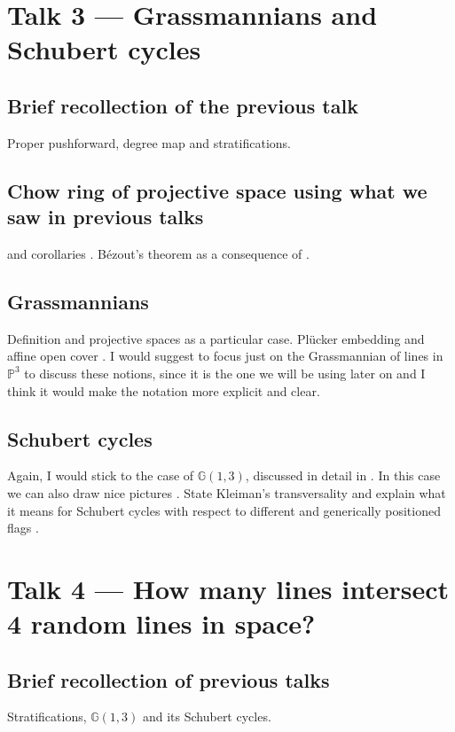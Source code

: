 \documentclass[A4paper, 12pt, british, reqno]{amsart}
\newcommand{\bbG}{\mathbb{G}}
\renewcommand{\P}{\mathbb{P}} %
\theoremstyle{plain}
\theoremstyle{definition}
\theoremstyle{remark}
\theoremstyle{plain}
\theoremstyle{definition}
\theoremstyle{remark}
\theoremstyle{plain}
\theoremstyle{definition}
\theoremstyle{remark}
\begin{document}
\section{Talk 3 --- Grassmannians and Schubert cycles}

\subsection{Brief recollection of the previous talk}
Proper pushforward, degree map and stratifications.

\subsection{Chow ring of projective space using what we saw in previous talks} \cite[Thm.~2.1]{eh16} and corollaries \cite[Cor.~2.2 and Cor.~2.3]{eh16}.
Bézout's theorem as a consequence of \cite[Thm.~2.1]{eh16}.

\subsection{Grassmannians}
Definition and projective spaces as a particular case.
Pl\"{u}cker embedding \cite[\S 3.2.1]{eh16} and affine open cover \cite[\S 3.2.2]{eh16}.
I would suggest to focus just on the Grassmannian of lines in $\P^{3}$ to discuss these notions, since it is the one we will be using later on and I think it would make the notation more explicit and clear.

\subsection{Schubert cycles}
Again, I would stick to the case of $\bbG(1,3)$, discussed in detail in \cite[\S 3.3.1]{eh16}.
In this case we can also draw nice pictures \cite[Fig.~3.3]{eh16}.
State Kleiman's transversality \cite[Thm.~1.7]{eh16} and explain what it means for Schubert cycles with respect to different and generically positioned flags \cite[pp.~105--106]{eh16}.

\section{Talk 4 --- How many lines intersect 4 random lines in space?}

\subsection{Brief recollection of previous talks}
Stratifications, $\bbG(1,3)$ and its Schubert cycles.
\end{document}
